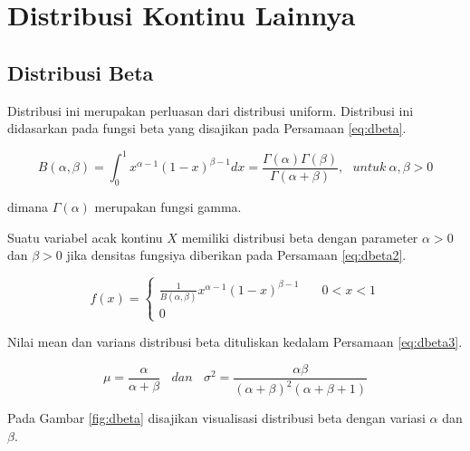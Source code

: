 \documentclass[]{book}
\begin{document}
\section{Distribusi Kontinu Lainnya}\label{distribusi-kontinu-lainnya}

\subsection{Distribusi Beta}\label{distribusi-beta}

Distribusi ini merupakan perluasan dari distribusi uniform. Distribusi
ini didasarkan pada fungsi beta yang disajikan pada Persamaan
\eqref{eq:dbeta}.

\begin{equation}
   B\left(\alpha,\beta\right)=\int_0^1x^{\alpha-1}\left(1-x\right)^{\beta-1}dx=\frac{\Gamma\left(\alpha\right)\Gamma\left(\beta\right)}{\Gamma\left(\alpha+\beta\right)},\ \ \ untuk\ \alpha,\beta>0
  \label{eq:dbeta}
\end{equation}

dimana \(\Gamma\left(\alpha\right)\) merupakan fungsi gamma.

Suatu variabel acak kontinu \(X\) memiliki distribusi beta dengan
parameter \(\alpha>0\) dan \(\beta>0\) jika densitas fungsiya diberikan
pada Persamaan \eqref{eq:dbeta2}.

\begin{equation}
f\left(x \right) =
  \begin{cases}
    \frac{1}{B\left(\alpha,\beta\right)}x^{\alpha-1}\left(1-x\right)^{\beta-1}       & \quad 0<x<1\\
    0                   & \quad\text{}
    \end{cases}
 \label{eq:dbeta2}
\end{equation}

Nilai mean dan varians distribusi beta dituliskan kedalam Persamaan
\eqref{eq:dbeta3}.

\begin{equation}
   \mu=\frac{\alpha}{\alpha+\beta}\ \ \ \ dan\ \ \ \ \sigma^2=\frac{\alpha\beta}{\left(\alpha+\beta\right)^2\left(\alpha+\beta+1\right)}
  \label{eq:dbeta3}
\end{equation}

Pada Gambar \ref{fig:dbeta} disajikan visualisasi distribusi beta dengan
variasi \(\alpha\) dan \(\beta\).
\end{document}

